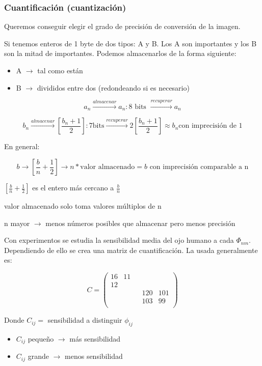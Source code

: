 		\subsubsection{Cuantificación (cuantización)}

			Queremos conseguir elegir el grado de precisión de conversión de la imagen.

			Si tenemos enteros de 1 byte de dos tipos: A y B. Los A son importantes y los B son la mitad de importantes. Podemos almacenarlos de la forma siguiente:
			\begin{itemize}
				\item A $\rightarrow$ tal como están
				\item B $\rightarrow$ divididos entre dos (redondeando si es necesario)
			\end{itemize}

			$$ a_{n} \xrightarrow{almacenar} a_n : 8 \text{ bits } \xrightarrow{recuperar} a_n $$

			$$ b_n \xrightarrow{almacenar} \left[ \frac{b_{n} + 1}{2} \right] : 7 \text{bits} \xrightarrow{recuperar} 2 \left[ \frac{b_n+1}{2} \right] \approx b_n \text{con imprecisión de 1} $$


			En general:

			$$ b \rightarrow \left[ \frac{b}{n} + \frac{1}{2} \right] \rightarrow n * \text{valor almacenado} = b \text{ con imprecisión comparable a n} $$

			$\left[ \frac{b}{n} + \frac{1}{2} \right]$ es el entero más cercano a $\frac{b}{n}$

			valor almacenado solo toma valores múltiplos de n

			n mayor $\rightarrow$ menos números posibles que almacenar pero menos precisión


			Con experimentos se estudia la sensibilidad media del ojo humano a cada $\Phi_{nm}$. Dependiendo de ello se crea una matriz de cuantificación. La usada generalmente es:


			$$ C = \left(\begin{matrix}
			16 & 11 & & & \\
			12 \\
			& & & 120 & 101 \\
			& & & 103 & 99 \\
			\end{matrix}\right)
			$$

			Donde $C_{ij} = $ sensibilidad a distinguir $\phi_{ij}$
			\begin{itemize}
				\item $C_{ij}$ pequeño $\rightarrow$ más sensibilidad
				\item $C_{ij}$ grande $\rightarrow$ menos sensibilidad
			\end{itemize}

